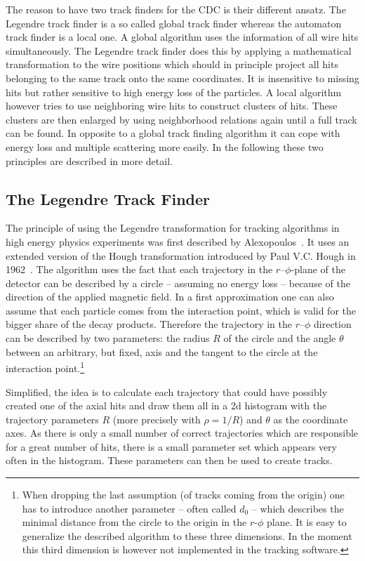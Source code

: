 The reason to have two track finders for the CDC is their different ansatz. The Legendre track finder is a so called global track finder whereas the automaton track finder is a local one. A global algorithm uses the information of all wire hits simultaneously. The Legendre track finder does this by applying a mathematical transformation to the wire positions which should in principle project all hits belonging to the same track onto the same coordinates. It is insensitive to missing hits but rather sensitive to high energy loss of the particles. A local algorithm however tries to use neighboring wire hits to construct clusters of hits. These clusters are then enlarged by using neighborhood relations again until a full track can be found. In opposite to a global track finding algorithm it can cope with energy loss and multiple scattering more easily. In the following these two principles are described in more detail.


\subsection{The Legendre Track Finder}
The principle of using the Legendre transformation for tracking algorithms in high energy physics experiments was first described by Alexopoulos~\cite{legendre}. It uses an extended version of the Hough transformation introduced by Paul V.C. Hough in 1962~\cite{hough}. The algorithm uses the fact that each trajectory in the $r$--$\phi$-plane of the detector can be described by a circle -- assuming no energy loss -- because of the direction of the applied magnetic field. In a first approximation one can also assume that each particle comes from the interaction point, which is valid for the bigger share of the decay products. Therefore the trajectory in the $r$--$\phi$ direction can be described by two parameters: the radius $R$ of the circle and the angle $\theta$ between an arbitrary, but fixed, axis and the tangent to the circle at the interaction point.\footnote{When dropping the last assumption (of tracks coming from the origin) one has to introduce another parameter -- often called $d_0$ -- which describes the minimal distance from the circle to the origin in the $r$-$\phi$ plane. It is easy to generalize the described algorithm to these three dimensions. In the moment this third dimension is however not implemented in the tracking software.}

Simplified, the idea is to calculate each trajectory that could have possibly created one of the axial hits and draw them all in a 2d histogram with the trajectory parameters $R$ (more precisely with $\rho = 1/R$) and $\theta$ as the coordinate axes. As there is only a small number of correct trajectories which are responsible for a great number of hits, there is a small parameter set which appears very often in the histogram. These parameters can then be used to create tracks.

